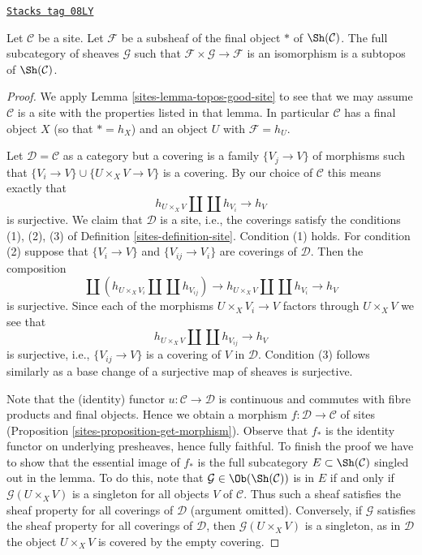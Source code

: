 \begin{lemma}
\label{sites-lemma-closed-subtopos}
\href{https://stacks.math.columbia.edu/tag/08LY}{\texttt{Stacks tag 08LY}}

Let $\mathcal{C}$ be a site. Let $\mathcal{F}$ be a subsheaf of the final
object $*$ of $\Sh(\mathcal{C})$. The full subcategory of sheaves
$\mathcal{G}$ such that $\mathcal{F} \times \mathcal{G} \to \mathcal{F}$
is an isomorphism is a subtopos of $\Sh(\mathcal{C})$.
\end{lemma}

\begin{proof}

We apply Lemma \ref{sites-lemma-topos-good-site} to see that we may assume
$\mathcal{C}$ is a site with the properties listed in that lemma.
In particular $\mathcal{C}$ has a final object $X$ (so that
$* = h_X$) and an object $U$ with $\mathcal{F} = h_U$.

\medskip\noindent
Let $\mathcal{D} = \mathcal{C}$ as a category but a covering
is a family $\{V_j \to V\}$ of morphisms such that
$\{V_i \to V\} \cup \{U \times_X V \to V\}$ is a covering.
By our choice of $\mathcal{C}$ this means exactly that
$$
h_{U \times_X V} \amalg \coprod h_{V_i} \longrightarrow h_V
$$
is surjective. We claim that $\mathcal{D}$ is a site, i.e., the coverings
satisfy the conditions (1), (2), (3) of Definition \ref{sites-definition-site}.
Condition (1) holds. For condition (2) suppose that
$\{V_i \to V\}$ and $\{V_{ij} \to V_i\}$ are coverings of $\mathcal{D}$.
Then the composition
$$
\coprod \left(
h_{U \times_X V_i} \amalg \coprod h_{V_{ij}}
\right) \longrightarrow
h_{U \times_X V} \amalg \coprod h_{V_i} \longrightarrow h_V
$$
is surjective. Since each of the morphisms $U \times_X V_i \to V$
factors through $U \times_X V$ we see that
$$
h_{U \times_X V} \amalg \coprod h_{V_{ij}} \longrightarrow h_V
$$
is surjective, i.e., $\{V_{ij} \to V\}$ is a covering of $V$ in
$\mathcal{D}$. Condition (3) follows similarly as a base change of
a surjective map of sheaves is surjective.

\medskip\noindent
Note that the (identity) functor $u : \mathcal{C} \to \mathcal{D}$ is
continuous and commutes with fibre products and final objects. Hence
we obtain a morphism $f : \mathcal{D} \to \mathcal{C}$ of sites
(Proposition \ref{sites-proposition-get-morphism}).
Observe that $f_*$ is the identity functor on underlying
presheaves, hence fully faithful. To finish the proof we have to
show that the essential image of $f_*$ is the full subcategory
$E \subset \Sh(\mathcal{C})$ singled out in the lemma. To do this, note
that $\mathcal{G} \in \Ob(\Sh(\mathcal{C}))$ is in $E$ if and only if
$\mathcal{G}(U \times_X V)$ is a singleton for all objects
$V$ of $\mathcal{C}$. Thus such a sheaf satisfies the
sheaf property for all coverings of $\mathcal{D}$ (argument omitted).
Conversely, if $\mathcal{G}$ satisfies the sheaf property
for all coverings of $\mathcal{D}$, then $\mathcal{G}(U \times_X V)$
is a singleton, as in $\mathcal{D}$ the object $U \times_X V$ is
covered by the empty covering.
\end{proof}

